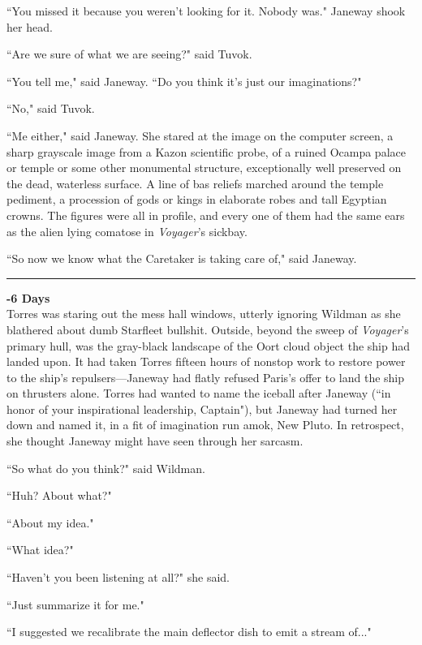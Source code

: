 \documentclass[twoside,letterpaper,12pt]{memoir}
\begin{document}
``You missed it because you weren't looking for it. Nobody was." Janeway shook her head. 

``Are we sure of what we are seeing?" said Tuvok. 

``You tell me," said Janeway. ``Do you think it's just our imaginations?" 

``No," said Tuvok. 

``Me either," said Janeway. She stared at the image on the computer screen, a sharp grayscale image from a Kazon scientific probe, of a ruined Ocampa palace or temple or some other monumental structure, exceptionally well preserved on the dead, waterless surface. A line of bas reliefs marched around the temple pediment, a procession of gods or kings in elaborate robes and tall Egyptian crowns. The figures were all in profile, and every one of them had the same ears as the alien lying comatose in \textit{Voyager}'s sickbay. 

``So now we know what the Caretaker is taking care of," said Janeway. 

\begin{center}\rule{3cm}{0.4 pt}\end{center} 

\noindent\textbf{-6 Days}\\

Torres was staring out the mess hall windows, utterly ignoring Wildman as she blathered about dumb Starfleet bullshit. Outside, beyond the sweep of \textit{Voyager}'s primary hull, was the gray-black landscape of the Oort cloud object the ship had landed upon. It had taken Torres fifteen hours of nonstop work to restore power to the ship's repulsers---Janeway had flatly refused Paris's offer to land the ship on thrusters alone. Torres had wanted to name the iceball after Janeway (``in honor of your inspirational leadership, Captain"), but Janeway had turned her down and named it, in a fit of imagination run amok, New Pluto. In retrospect, she thought Janeway might have seen through her sarcasm. 

``So what do you think?" said Wildman. 

``Huh? About what?" 

``About my idea." 

``What idea?" 

``Haven't you been listening at all?" she said. 

``Just summarize it for me." 

``I suggested we recalibrate the main deflector dish to emit a stream of..." 
\end{document}
